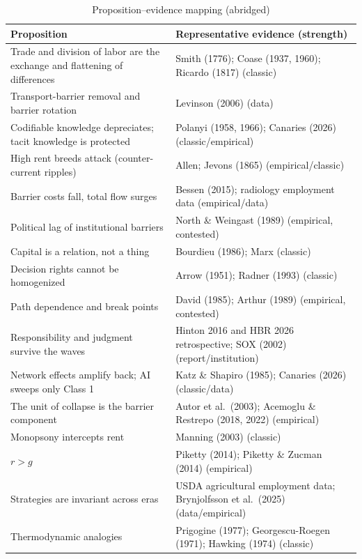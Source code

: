 \documentclass[11pt]{article}
\begin{document}
\begin{table}[h]
\centering\small
\caption{Proposition--evidence mapping (abridged)}
\label{tab:evidence}
\begin{tabular}{p{}p{}}
\toprule
Proposition & Representative evidence (strength)\\
\midrule
Trade and division of labor are the exchange and flattening of differences & Smith (1776); Coase (1937, 1960); Ricardo (1817) (classic)\\
Transport-barrier removal and barrier rotation & Levinson (2006) (data)\\
Codifiable knowledge depreciates; tacit knowledge is protected & Polanyi (1958, 1966); Canaries (2026) (classic/empirical)\\
High rent breeds attack (counter-current ripples) & Allen; Jevons (1865) (empirical/classic)\\
Barrier costs fall, total flow surges & Bessen (2015); radiology employment data (empirical/data)\\
Political lag of institutional barriers & North \& Weingast (1989) (empirical, contested)\\
Capital is a relation, not a thing & Bourdieu (1986); Marx (classic)\\
Decision rights cannot be homogenized & Arrow (1951); Radner (1993) (classic)\\
Path dependence and break points & David (1985); Arthur (1989) (empirical, contested)\\
Responsibility and judgment survive the waves & Hinton 2016 and HBR 2026 retrospective; SOX (2002) (report/institution)\\
Network effects amplify back; AI sweeps only Class 1 & Katz \& Shapiro (1985); Canaries (2026) (classic/data)\\
The unit of collapse is the barrier component & Autor et al.\ (2003); Acemoglu \& Restrepo (2018, 2022) (empirical)\\
Monopsony intercepts rent & Manning (2003) (classic)\\
$r>g$ & Piketty (2014); Piketty \& Zucman (2014) (empirical)\\
Strategies are invariant across eras & USDA agricultural employment data; Brynjolfsson et al.\ (2025) (data/empirical)\\
Thermodynamic analogies & Prigogine (1977); Georgescu-Roegen (1971); Hawking (1974) (classic)\\
\bottomrule
\end{tabular}
\end{table}
\end{document}
